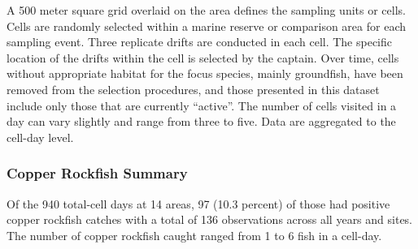 \documentclass[11pt,
  english,
  a4paper,
]{article}
\begin{document}
\leavevmode\tagmcend\tagstructend\par


A 500 meter square grid overlaid on the area defines the sampling units or cells. Cells are randomly selected within a marine reserve or comparison area for each sampling event. Three replicate drifts are conducted in each cell. The specific location of the drifts within the cell is selected by the captain. Over time, cells without appropriate habitat for the focus species, mainly groundfish, have been removed from the selection procedures, and those presented in this dataset include only those that are currently ``active''. The number of cells visited in a day can vary slightly and range from three to five. Data are aggregated to the cell-day level.

\leavevmode\tagmcend\tagstructend\par


\hypertarget{copper-rockfish-summary}{%
\subsubsection{Copper Rockfish Summary}\label{copper-rockfish-summary}}

\leavevmode\tagmcend\tagstructend


Of the 940 total-cell days at 14 areas, 97 (10.3 percent) of those had positive copper rockfish catches with a total of 136 observations across all years and sites. The number of copper rockfish caught ranged from 1 to 6 fish in a cell-day.

\leavevmode\tagmcend\tagstructend\par

\begingroup\fontsize{10}{12}\selectfont
\end{document}
